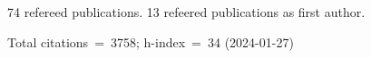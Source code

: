 74 refereed publications. 13 refeered publications as first author.

Total citations~=~3758; h-index~=~34 (2024-01-27)